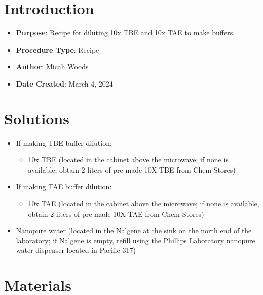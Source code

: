 \documentclass[
  letterpaper,
  DIV=11,
  numbers=noendperiod]{scrreprt}
\providecommand{\tightlist}{%
  \setlength{\itemsep}{0pt}\setlength{\parskip}{0pt}}\usepackage{longtable,booktabs,array}
\begin{document}
\hypertarget{introduction-103}{%
\section{Introduction}\label{introduction-103}}

\begin{itemize}
\tightlist
\item
  \textbf{Purpose}: Recipe for diluting 10x TBE and 10x TAE to make
  buffers.
\item
  \textbf{Procedure Type}: Recipe
\item
  \textbf{Author}: Micah Woods
\item
  \textbf{Date Created}: March 4, 2024
\end{itemize}

\hypertarget{solutions-89}{%
\section{Solutions}\label{solutions-89}}

\begin{itemize}
\tightlist
\item
  If making TBE buffer dilution:

  \begin{itemize}
  \tightlist
  \item
    10x TBE (located in the cabinet above the microwave; if none is
    available, obtain 2 liters of pre-made 10X TBE from Chem Stores)
  \end{itemize}
\item
  If making TAE buffer dilution:

  \begin{itemize}
  \tightlist
  \item
    10x TAE (located in the cabinet above the microwave; if none is
    available, obtain 2 liters of pre-made 10X TAE from Chem Stores)
  \end{itemize}
\item
  Nanopure water (located in the Nalgene at the sink on the north end of
  the laboratory; if Nalgene is empty, refill using the Phillips
  Laboratory nanopure water dispenser located in Pacific 317)
\end{itemize}

\hypertarget{materials-98}{%
\section{Materials}\label{materials-98}}
\end{document}
